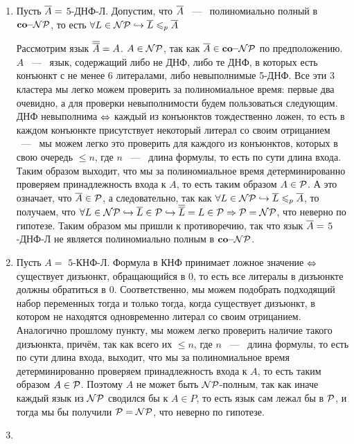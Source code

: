 \documentclass[a4paper,12pt]{article}
\begin{document}
\begin{solution}
	
	\begin{enumerate}
		\item Пусть $\ol{A} =$ $5$-ДНФ-Л. Допустим, что $\ol{A}$ ~---~ полиномиально полный в $\coNP$, то есть $\forall L \in \NP \vyp \ol{L} \polysv \ol{A}$
		
		Рассмотрим язык $\ol{\ol{A}} = A$. $A \in \NP$, так как $\ol{A} \in \coNP$ по предположению. $A$ ~---~ язык, содержащий либо не ДНФ, либо те ДНФ, в которых есть конъюнкт с не менее 6 литералами, либо невыполнимые 5-ДНФ. Все эти 3 кластера мы легко можем проверить за полиномиальное время: первые два очевидно, а для проверки невыполнимости будем пользоваться следующим. ДНФ невыполнима $\LRa$ каждый из конъюнктов тождественно ложен, то есть в каждом конъюнкте присутствует некоторый литерал со своим отрицанием ~---~ мы можем легко это проверить для каждого из конъюнктов, которых в свою очередь $\le n$, где $n$ ~---~ длина формулы, то есть по сути длина входа. Таким образом выходит, что мы за полиномиальное время детерминированно проверяем принадлежность входа к $A$, то есть таким образом $A \in \P$. А это означает, что $\ol{A} \in \P$, а следовательно, так как $\forall L \in \NP \vyp \ol{L} \polysv \ol{A}$, то получаем, что $\forall L \in \NP \vyp \ol{L} \in \P \vyp \ol{\ol{L}}=L \in \P \Ra \P = \NP$, что неверно по гипотезе. Таким образом мы пришли к противоречию, так что язык $\ol{A} =$ $5$-ДНФ-Л не является полиномиально полным в $\coNP$.
		
		\item Пусть $A =$ $5$-КНФ-Л. Формула в КНФ принимает ложное значение $\LRa$ существует дизъюнкт, обращающийся в 0, то есть все литералы в дизъюнкте должны обратиться в 0. Соответственно, мы можем подобрать подходящий набор переменных тогда и только тогда, когда существует дизъюнкт, в котором не находятся одновременно литерал со своим отрицанием. Аналогично прошлому пункту, мы можем легко проверить наличие такого дизъюнкта, причём, так как всего их $\le n$, где $n$ ~---~ длина формулы, то есть по сути длина входа, выходит, что мы за полиномиальное время детерминированно проверяем принадлежность входа к $A$, то есть таким образом $A \in \P$. Поэтому $A$ не может быть $\NP$-полным, так как иначе каждый язык из $\NP$ сводился бы к $A \in P$, то есть язык сам лежал бы в $\P$, и тогда мы бы получили $\P = \NP$, что неверно по гипотезе.
		
		\item 
		

\end{enumerate}
\end{solution}
\end{document}
